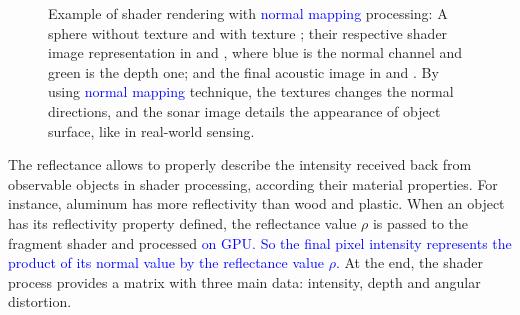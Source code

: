 \documentclass[final,5p,times]{elsarticle}
\begin{document}
\begin{figure}[t]
{        \label{fig:normal_5}
    }
    \captionsetup{justification=justified}
    \caption{Example of shader rendering with \textcolor{blue}{normal mapping} processing:
    A sphere without texture  and with texture
    ; their respective shader image representation
    in  and , where blue is the
    normal channel and green is the depth one; and the final acoustic
    image in  and . By using
    \textcolor{blue}{normal mapping} technique, the textures changes the normal directions,
    and the sonar image details the appearance of object surface, like
    in real-world sensing.}
    \label{fig:sonar_normal_mapping}
\end{figure}

The reflectance allows to properly describe the intensity received back
from observable objects in shader processing, according their material
properties. For instance, aluminum has more reflectivity than wood and plastic.
When an object has its reflectivity property defined, the reflectance value
$\rho$ is passed to the fragment shader and processed \textcolor{blue}{on GPU. So the final
pixel intensity represents the product of its normal value by the reflectance
value $\rho$.} At the end, the shader process provides a matrix with three main
data: intensity, depth and angular distortion.
\end{document}
